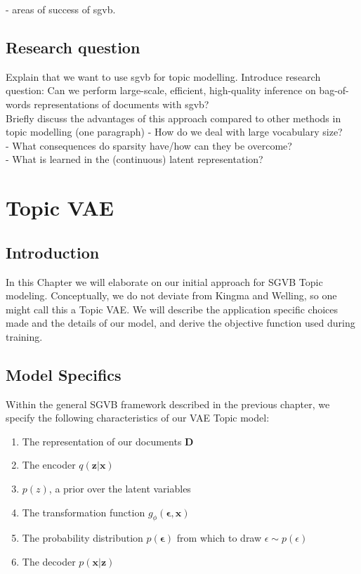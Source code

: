 \documentclass{report}
\begin{document}
- areas of success of sgvb.


\section{Research question}
Explain that we want to use sgvb for topic modelling. Introduce research question:
Can we perform large-scale, efficient, high-quality inference on bag-of-words representations of documents with sgvb? \\
Briefly discuss the advantages of this approach compared to other methods in topic modelling (one paragraph)
-	How do we deal with large vocabulary size?\\
-	What consequences do sparsity have/how can they be overcome? \\
-	What is learned in the (continuous) latent representation?



\pagebreak 
\nocite{*}


\chapter{Topic VAE}
\section{Introduction}
In this Chapter we will elaborate on our initial approach for SGVB Topic modeling. Conceptually, we do not deviate from Kingma and Welling\cite{kingma2013auto}, so one might call this a Topic VAE. We will describe the application specific choices made and the details of our model, and derive the objective function used during training. 

\section{Model Specifics}

Within the general SGVB framework described in the previous chapter, we specify the following characteristics of our VAE Topic model:

\begin{enumerate}
	\item The representation of our documents $\mathbf{D}$
	\item The encoder $q(\mathbf{z}|\mathbf{x})$
	\item $p(z)$, a prior  over the latent variables
	\item The transformation function $g_\phi(\boldsymbol{\epsilon},\mathbf{x})$
	\item The  probability distribution  $p(\mathbf{\epsilon})$ from which to draw $\epsilon \sim p(\epsilon)$
	\item The decoder $p(\mathbf{x}|\mathbf{z})$
\end{enumerate}
\end{document}
